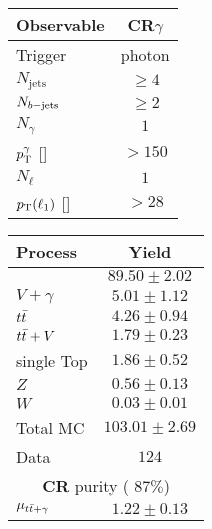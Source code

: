 		\begin{table}[!htb]
			\parbox{.45\linewidth}{
			\centering
			\label{tab:CRcuts}
		   	\begin{tabular}{lc}
					\toprule
					\textbf{Observable} & CR$\gamma$ \\
					\midrule
					Trigger & photon\\
					$N_{\mathrm{jets}}$ & $\geq 4$ \\ 
					$N_{b\mathrm{-jets}}$ & $\geq 2$ \\ \midrule
					$N_\gamma$ & $1$ \\ 
					$p_{\mathrm{T}}^{\gamma}$ [\GeV] & $>150$ \\
					$N_\ell$ & $1$ \\ 
					$p_{\mathrm{T}}(\ell_1)$ [\GeV] & $>28$ \\ \bottomrule
			  \end{tabular}
			}
			\hfill
			\parbox{.45\linewidth}{
			\centering
			\label{tab:CRgamma_yields}
				\begin{tabular}{lc}
					\toprule
					\textbf{Process} & \textbf{Yield} \\
					\toprule
					\ttgamma & $89.50 \pm 2.02$ \\
					$V+\gamma$ & $5.01 \pm 1.12$ \\
					$t\bar{t}$ & $4.26 \pm 0.94$ \\
					$t\bar{t}+V$ & $1.79 \pm 0.23$ \\
					single Top & $1.86 \pm 0.52$ \\
					$Z$ & $0.56 \pm 0.13$ \\
					$W$ & $0.03 \pm 0.01$ \\
					\midrule
					Total MC & $103.01 \pm 2.69$ \\
					Data & $124$ \\
					\midrule
					\multicolumn{2}{c}{\textbf{CR}{\bm{$\gamma$} purity} ( $87\%$)} \\ 
					\midrule
					$\mu_{t\bar{t}+\gamma}$ & $1.22 \pm 0.13$ \\
					\bottomrule
				\end{tabular}
			}
		\end{table}

